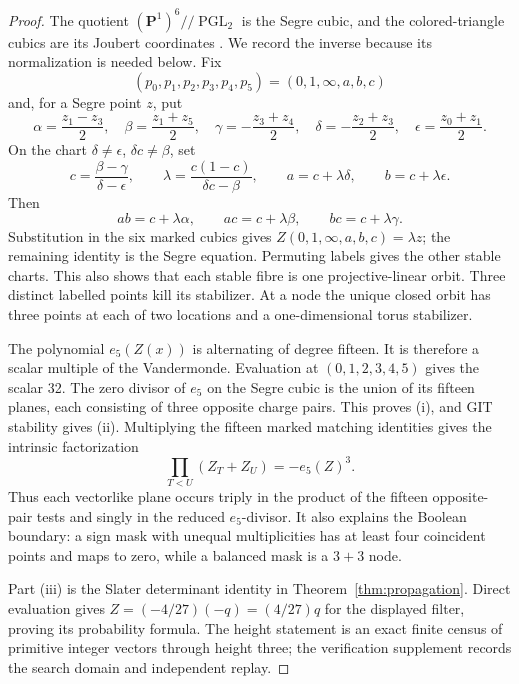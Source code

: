 \documentclass[11pt]{article}
\theoremstyle{definition}
\theoremstyle{remark}
\begin{document}
\begin{proof}
The quotient
\((\mathbf P^1)^6/\!/\operatorname{PGL}_2\) is the Segre cubic, and the
colored-triangle cubics are its Joubert coordinates
\cite{HMSVOuter,HMSV}.  We record the inverse because its normalization is
needed below.  Fix
\[
 (p_0,p_1,p_2,p_3,p_4,p_5)=(0,1,\infty,a,b,c)
\]
and, for a Segre point \(z\), put
\[
 \alpha=\frac{z_1-z_3}{2},\quad
 \beta=\frac{z_1+z_5}{2},\quad
 \gamma=-\frac{z_3+z_4}{2},\quad
 \delta=-\frac{z_2+z_3}{2},\quad
 \epsilon=\frac{z_0+z_1}{2}.
\]
On the chart \(\delta\ne\epsilon\), \(\delta c\ne\beta\), set
\[
 c=\frac{\beta-\gamma}{\delta-\epsilon},\qquad
 \lambda=\frac{c(1-c)}{\delta c-\beta},\qquad
 a=c+\lambda\delta,\qquad b=c+\lambda\epsilon.
\]
Then
\[
 ab=c+\lambda\alpha,\qquad
 ac=c+\lambda\beta,\qquad
 bc=c+\lambda\gamma.
\]
Substitution in the six marked cubics gives
\(Z(0,1,\infty,a,b,c)=\lambda z\); the remaining identity is the Segre
equation.  Permuting labels gives the other stable charts.  This also shows
that each stable fibre is one projective-linear orbit.  Three distinct
labelled points kill its stabilizer.  At a node the unique closed orbit has
three points at each of two locations and a one-dimensional torus
stabilizer.

The polynomial \(e_5(Z(x))\) is alternating of degree fifteen.  It is
therefore a scalar multiple of the Vandermonde.  Evaluation at
\((0,1,2,3,4,5)\) gives the scalar 32.  The zero divisor of \(e_5\) on the
Segre cubic is the union of its fifteen planes, each consisting of three
opposite charge pairs.  This proves (i), and GIT stability gives (ii).
Multiplying the fifteen marked matching identities gives the intrinsic
factorization
\[
 \prod_{T<U}(Z_T+Z_U)=-e_5(Z)^3.
\]
Thus each vectorlike plane occurs triply in the product of the fifteen
opposite-pair tests and singly in the reduced \(e_5\)-divisor.
It also explains the Boolean boundary: a sign mask with unequal
multiplicities has at least four coincident points and maps to zero, while
a balanced mask is a \(3+3\) node.

Part (iii) is the Slater determinant identity in
Theorem~\ref{thm:propagation}.  Direct evaluation gives
\(Z=(-4/27)(-q)=(4/27)q\) for the displayed filter, proving its probability
formula.  The height statement is an exact finite census of primitive
integer vectors through height three; the verification supplement records
the search domain and independent replay.
\end{proof}
\end{document}
